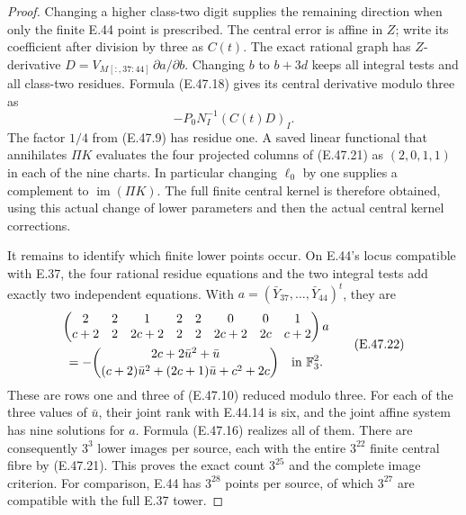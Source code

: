 \begin{proof}
Changing a higher class-two digit supplies the
remaining direction when only the finite E.44
point is prescribed.  The central error is
affine in $Z$; write its coefficient after
division by three as $C(t)$.  The exact rational
graph has $Z$-derivative
$D=V_M{}_{[:,37:44]}\,\partial a/\partial b$.
Changing $b$ to $b+3d$ keeps all integral tests
and all class-two residues.  Formula
\textup{(E.47.18)} gives its central derivative
modulo three as
\[
                   -P_0N_I^{-1}(C(t)D)_I.
 \tag{E.47.21}
\]
The factor $1/4$ from \textup{(E.47.9)} has
residue one.  A saved linear functional that
annihilates $\Pi K$ evaluates the four projected
columns of \textup{(E.47.21)} as $(2,0,1,1)$
in each of the nine charts.  In particular
changing $\ell_0$ by one supplies a complement
to $\operatorname{im}(\Pi K)$.  The full finite
central kernel is therefore obtained, using
this actual change of lower parameters and
then the actual central kernel corrections.

It remains to identify which finite lower
points occur.  On E.44's locus compatible
with E.37, the four rational residue equations
and the two integral tests add exactly two
independent equations.  With
$a=(\bar Y_{37},\ldots,\bar Y_{44})^t$, they are
\[
 \begin{gathered}
 \begin{pmatrix}
 2&2&1&2&2&0&0&1\\
 c+2&2&2c+2&2&2&2c+2&2c&c+2
 \end{pmatrix}a\\
 =-\binom{2c+2\bar u^2+\bar u}
 {(c+2)\bar u^2+(2c+1)\bar u+c^2+2c}
                   \quad\hbox{in }\mathbb F_3^2.
 \end{gathered}
 \tag{E.47.22}
\]
These are rows one and three of
\textup{(E.47.10)} reduced modulo three.
For each of the three values of $\bar u$,
their joint rank with E.44.14 is six, and the
joint affine system has nine solutions for
$a$.  Formula \textup{(E.47.16)} realizes all
of them.  There are consequently $3^3$ lower
images per source, each with the entire
$3^{22}$ finite central fibre by
\textup{(E.47.21)}.  This proves the exact
count $3^{25}$ and the complete image criterion.
For comparison, E.44 has $3^{28}$ points per
source, of which $3^{27}$ are compatible with
the full E.37 tower.


\end{proof}
